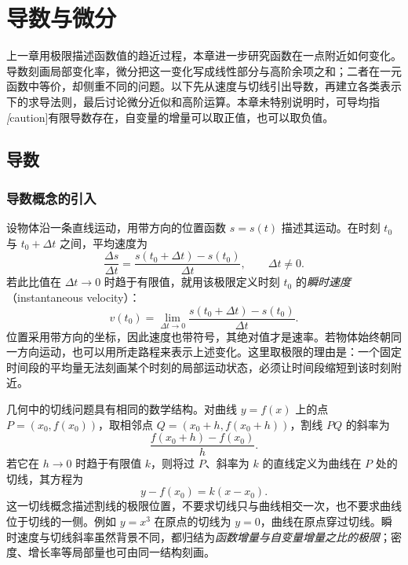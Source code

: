\setcounter{chapter}{3} %
\chapter{导数与微分}
\label{chap:derivatives-and-differentials}

上一章用极限描述函数值的趋近过程，本章进一步研究函数在一点附近如何变化。导数刻画局部变化率，微分把这一变化写成线性部分与高阶余项之和；二者在一元函数中等价，却侧重不同的问题。以下先从速度与切线引出导数，再建立各类表示下的求导法则，最后讨论微分近似和高阶运算。本章未特别说明时，可导均指\emph[caution]{有限导数存在}，自变量的增量可以取正值，也可以取负值。

\section{导数}
\label{sec:derivatives}

\subsection{导数概念的引入}
\label{subsec:introduction-to-derivatives}

设物体沿一条直线运动，用带方向的位置函数 $s=s(t)$ 描述其运动。在时刻 $t_0$ 与 $t_0+\Delta t$ 之间，平均速度为
\[
    \frac{\Delta s}{\Delta t}
    =\frac{s(t_0+\Delta t)-s(t_0)}{\Delta t},\qquad \Delta t\ne0.
\]
若此比值在 $\Delta t\to0$ 时趋于有限值，就用该极限定义时刻 $t_0$ 的\emph{瞬时速度}（instantaneous velocity）：
\[
    v(t_0)=\lim_{\Delta t\to0}
    \frac{s(t_0+\Delta t)-s(t_0)}{\Delta t}.
\]
位置采用带方向的坐标，因此速度也带符号，其绝对值才是速率。若物体始终朝同一方向运动，也可以用所走路程来表示上述变化。这里取极限的理由是：一个固定时间段的平均量无法刻画某个时刻的局部运动状态，必须让时间段缩短到该时刻附近。

几何中的切线问题具有相同的数学结构。对曲线 $y=f(x)$ 上的点 $P=(x_0,f(x_0))$，取相邻点 $Q=(x_0+h,f(x_0+h))$，割线 $PQ$ 的斜率为
\[
    \frac{f(x_0+h)-f(x_0)}h.
\]
若它在 $h\to0$ 时趋于有限值 $k$，则将过 $P$、斜率为 $k$ 的直线定义为曲线在 $P$ 处的切线，其方程为
\begin{equation}
\label{eq:tangent-line-from-derivative}
    y-f(x_0)=k(x-x_0).
\end{equation}
这一切线概念描述割线的极限位置，不要求切线只与曲线相交一次，也不要求曲线位于切线的一侧。例如 $y=x^3$ 在原点的切线为 $y=0$，曲线在原点穿过切线。瞬时速度与切线斜率虽然背景不同，都归结为\emph{函数增量与自变量增量之比的极限}；密度、增长率等局部量也可由同一结构刻画。

